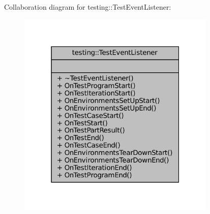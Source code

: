 Collaboration diagram for testing\+:\+:Test\+Event\+Listener\+:
\nopagebreak
\begin{figure}[H]
\begin{center}
\leavevmode
\includegraphics[width=268pt]{classtesting_1_1TestEventListener__coll__graph}
\end{center}
\end{figure}
